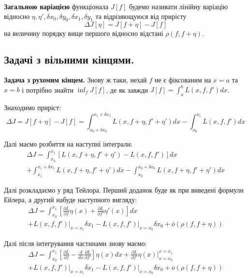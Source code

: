 \documentclass[14pt]{extarticle}
\newcommand{\<}{\langle}
\renewcommand{\>}{\rangle}
\theoremstyle{mystyle}{\newtheorem{definition}{Definition}[section]}
\theoremstyle{mystyle}{\newtheorem{proposition}[definition]{Proposition}}
\theoremstyle{mystyle}{\newtheorem{theorem}[definition]{Theorem}}
\theoremstyle{mystyle}{\newtheorem{lemma}[definition]{Lemma}}
\theoremstyle{mystyle}{\newtheorem{corollary}[definition]{Corollary}}
\theoremstyle{mystyle}{\newtheorem*{remark}{Remark}}
\theoremstyle{mystyle}{\newtheorem*{remarks}{Remarks}}
\theoremstyle{mystyle}{\newtheorem*{example}{Example}}
\theoremstyle{mystyle}{\newtheorem*{examples}{Examples}}
\theoremstyle{definition}{\newtheorem*{exercise}{Exercise}}
\theoremstyle{cstyle}{\newtheorem*{cthm}{}}
\theoremstyle{warn}
\begin{document}
\begin{definition}
    \textbf{Загальною варіацією} функціонала $J[f]$ будемо називати лінійну варіацію відносно $\eta,\eta',\delta x_0,\delta y_0,\delta x_1, \delta y_1$ та відрізяющуюся від прирісту 
    \begin{equation}
        \Delta J[\eta] = J[f+\eta] - J[f]
    \end{equation}
    на величину порядку вище першого відносно відстані $\rho(f,f+\eta)$.
\end{definition}

\subsection{Задачі з вільними кінцями.}

\textbf{Задача з рухомим кінцем.} Знову ж таки, нехай $f$ не є фіксованим на $x=a$ та $x=b$ і потрібно знайти $\inf_f J[f]$, де як завжди $J[f]=\int_a^b L(x,f,f')dx$. 

Знаходимо приріст:
\begin{equation}
    \Delta J = J[f+\eta] - J[f] = \int_{x_0+\delta x_0}^{x_1+\delta x_1}L(x,f+\eta,f'+\eta')dx - \int_{x_0}^{x_1}L(x,f,f')dx
\end{equation}

Далі маємо розбиття на наступні інтеграли:
\begin{gather}
    \Delta J = \int_{x_0}^{x_1}\left[L(x,f+\eta,f'+\eta')-L(x,f,f')\right]dx \nonumber \\ + \int_{x_1}^{x_1+\delta x_1}L(x,f+\eta,f'+\eta')dx - \int_{x_0}^{x_0+\delta x_0}L(x,f+\eta,f'+\eta')dx
\end{gather}

Далі розкладаємо у ряд Тейлора. Перший доданок буде як при виведені формули Ейлера, а другий набуде наступного вигляду:
\begin{gather}
    \Delta J = \int_{x_0}^{x_1}\left[\frac{\partial L}{\partial f}\eta(x)+\frac{\partial L}{\partial f'}\eta'(x)\right]dx \nonumber \\
    + L(x,f,f')\Big|_{x=x_1}\delta x_1 - L(x,f,f')\Big|_{x=x_0}\delta x_0 + \overline{o}(\rho(f,f+\eta))
\end{gather}

Далі після інтегрування частинами знову маємо:
\begin{gather}
    \Delta J = \int_{x_0}^{x_1}\left[\frac{\partial L}{\partial f}-\frac{d}{dx}\frac{\partial L}{\partial f'}\right]\eta(x)dx + \frac{\partial L}{\partial f'}\eta(x)\Big|_{x=x_0}^{x=x_1} \nonumber \\
 + L(x,f,f')\Big|_{x=x_1}\delta x_1 - L(x,f,f')\Big|_{x=x_0}\delta x_0 + \overline{o}(\rho(f,f+\eta))
\end{gather}
\end{document}
